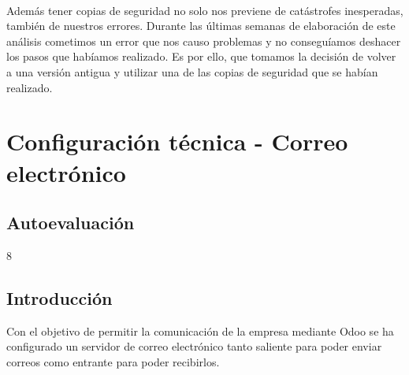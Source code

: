 \paragraph{}
Además tener copias de seguridad no solo nos previene de catástrofes inesperadas, también de nuestros errores. Durante las últimas semanas de elaboración de este análisis cometimos un error que nos causo problemas y no conseguíamos deshacer los pasos que habíamos realizado. Es por ello, que tomamos la decisión de volver a una versión antigua y utilizar una de las copias de seguridad que se habían realizado.
\newpage
\section{Configuración técnica - Correo electrónico}
\label{sec:correo}
\subsection{Autoevaluación}
8
\subsection{Introducción}
Con el objetivo de permitir la comunicación de la empresa mediante Odoo se ha configurado un servidor de correo electrónico tanto saliente para poder enviar correos como entrante para poder recibirlos.
